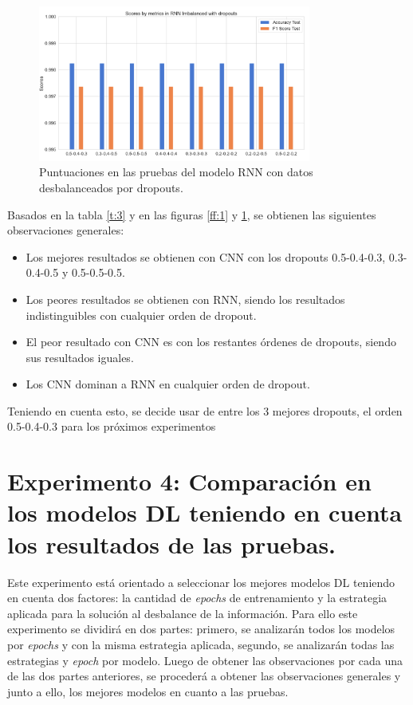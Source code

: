 \begin{figure}[h!]
	\centering
	\includegraphics[width=0.8\textwidth]{"figuras/Experimento3/RNN_dropouts_tests"}
	\caption{Puntuaciones en las pruebas del modelo RNN con datos desbalanceados por dropouts.}
	\label{ff:2}
\end{figure}

Basados en la tabla \ref{t:3} y en las figuras \ref{ff:1} y \ref{ff:2}, se obtienen las siguientes observaciones generales:
\begin{itemize}
	\item Los mejores resultados se obtienen con CNN con los dropouts 0.5-0.4-0.3, 0.3-0.4-0.5 y 0.5-0.5-0.5.
	\item Los peores resultados se obtienen con RNN, siendo los resultados indistinguibles con cualquier orden de dropout.
	\item El peor resultado con CNN es con los restantes \'{o}rdenes de dropouts, siendo sus resultados iguales.
	\item Los CNN dominan a RNN en cualquier orden de dropout.
\end{itemize}

Teniendo en cuenta esto, se decide usar de entre los 3 mejores dropouts, el orden 0.5-0.4-0.3 para los pr\'{o}ximos experimentos

\section{Experimento 4: Comparaci\'{o}n en los modelos DL teniendo en cuenta los resultados de las pruebas.}

  Este experimento est\'{a} orientado a seleccionar los mejores modelos DL teniendo en cuenta dos factores: la cantidad de \textit{epochs} de entrenamiento y la estrategia aplicada para la soluci\'{o}n al desbalance de la informaci\'{o}n. Para ello este experimento se dividir\'{a} en dos partes: primero, se analizar\'{a}n todos los modelos por \textit{epochs} y con la misma estrategia aplicada, segundo, se analizar\'{a}n todas las estrategias y \textit{epoch} por modelo. Luego de obtener las observaciones por cada una de las dos partes anteriores, se proceder\'{a} a obtener las observaciones generales y junto a ello, los mejores modelos en cuanto a las pruebas.
  
